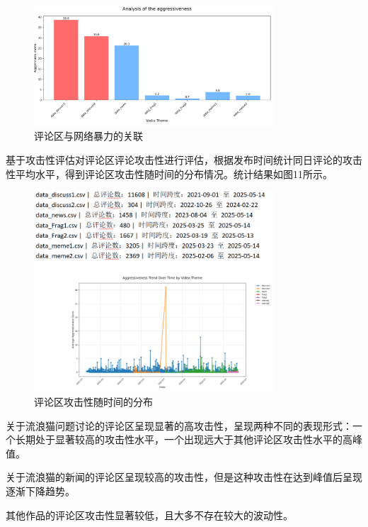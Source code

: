 \documentclass[12pt,a4paper]{ctexart}
\begin{document}
\begin{figure}[htbp]
    \centering
    \includegraphics[width=0.8\textwidth]{img/comment_area_vs_violence.png}
    \caption{评论区与网络暴力的关联}
    \label{fig:comment_area_vs_violence}
\end{figure}

基于攻击性评估对评论区评论攻击性进行评估，根据发布时间统计同日评论的攻击性平均水平，得到评论区攻击性随时间的分布情况。统计结果如图11所示。

\begin{figure}[htbp]
    \centering
    \includegraphics[width=0.8\textwidth]{img/comment_area_vs_violence_time.png}
    \caption{评论区攻击性随时间的分布}
    \label{fig:comment_area_vs_violence_time}
\end{figure}

关于流浪猫问题讨论的评论区呈现显著的高攻击性，呈现两种不同的表现形式：一个长期处于显著较高的攻击性水平，一个出现远大于其他评论区攻击性水平的高峰值。

关于流浪猫的新闻的评论区呈现较高的攻击性，但是这种攻击性在达到峰值后呈现逐渐下降趋势。

其他作品的评论区攻击性显著较低，且大多不存在较大的波动性。
\end{document}
